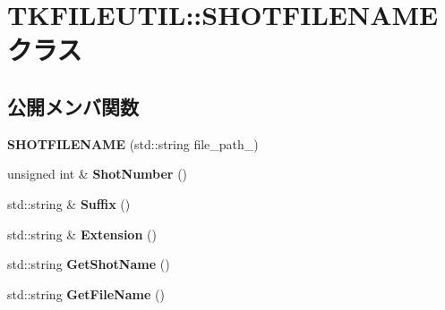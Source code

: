 \hypertarget{class_t_k_f_i_l_e_u_t_i_l_1_1_s_h_o_t_f_i_l_e_n_a_m_e}{}\section{T\+K\+F\+I\+L\+E\+U\+T\+IL\+:\+:S\+H\+O\+T\+F\+I\+L\+E\+N\+A\+ME クラス}
\label{class_t_k_f_i_l_e_u_t_i_l_1_1_s_h_o_t_f_i_l_e_n_a_m_e}
\subsection*{公開メンバ関数}
\begin{DoxyCompactItemize}
\item 
\mbox{\label{class_t_k_f_i_l_e_u_t_i_l_1_1_s_h_o_t_f_i_l_e_n_a_m_e_a861f9e8e0995a90ec76f9f256a896edd}} 
{\bfseries S\+H\+O\+T\+F\+I\+L\+E\+N\+A\+ME} (std\+::string file\+\_\+path\+\_\+)
\item 
\mbox{\label{class_t_k_f_i_l_e_u_t_i_l_1_1_s_h_o_t_f_i_l_e_n_a_m_e_a428c708a7e372ff4b4e86e8eff66b3a3}} 
unsigned int \& {\bfseries Shot\+Number} ()
\item 
\mbox{\label{class_t_k_f_i_l_e_u_t_i_l_1_1_s_h_o_t_f_i_l_e_n_a_m_e_adc23c9888f4b386bc13232a897b1e08f}} 
std\+::string \& {\bfseries Suffix} ()
\item 
\mbox{\label{class_t_k_f_i_l_e_u_t_i_l_1_1_s_h_o_t_f_i_l_e_n_a_m_e_a5feb9f8c9d45ecd63c4a6a3b04d8f0a3}} 
std\+::string \& {\bfseries Extension} ()
\item 
\mbox{\label{class_t_k_f_i_l_e_u_t_i_l_1_1_s_h_o_t_f_i_l_e_n_a_m_e_a84aa068dc876ba72469738e353e81d39}} 
std\+::string {\bfseries Get\+Shot\+Name} ()
\item 
\mbox{\label{class_t_k_f_i_l_e_u_t_i_l_1_1_s_h_o_t_f_i_l_e_n_a_m_e_a117febf22182245999d54b2275dce157}} 
std\+::string {\bfseries Get\+File\+Name} ()
\item 

\end{DoxyCompactItemize}
